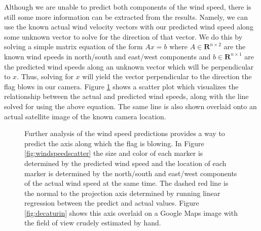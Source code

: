 Although we are unable to predict both components of the wind speed, there is still some more information can be extracted from the results. Namely, we can use the known actual wind velocity vectors with our predicted wind speed along some unknown vector to solve for the direction of that vector. We do this by solving a simple matrix equation of the form $Ax=b$ where $A \in \mathbf{R}^{n\times 2}$ are the known wind speeds in north/south and east/west components and $b \in \mathbf{R}^{n \times 1}$ are the predicted wind speeds along an unknown vector which will be perpendicular to $x$. Thus, solving for $x$ will yield the vector perpendicular to the direction the flag blows in our camera. Figure \ref{fig:winddirpred} shows a scatter plot which visualizes the relationship between the actual and predicted wind speeds, along with the line solved for using the above equation. The same line is also shown overlaid onto an actual satellite image of the known camera location.
\begin{figure}
	\centering
	\caption{Further analysis of the wind speed predictions provides a way to predict the axis along which the flag is blowing. In Figure \ref{fig:windspeedscatter} the size and color of each marker is determined by the predicted wind speed and the location of each marker is determined by the north/south and east/west components of the actual wind speed at the same time. The dashed red line is the normal to the projection axis determined by running linear regression between the predict and actual values. Figure \ref{fig:decaturin} shows this axis overlaid on a Google Maps image with the field of view crudely estimated by hand.}
	\label{fig:winddirpred}
\end{figure}

